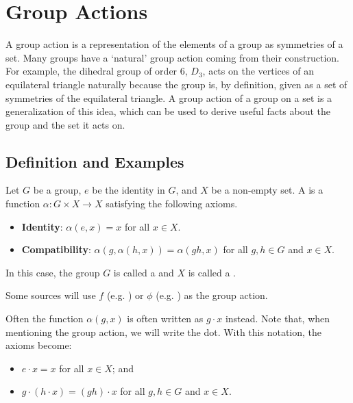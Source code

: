 \chapter{Group Actions}
A group action is a representation of the elements of a group as symmetries of a set. Many groups have a `natural' group action coming from their construction. For example, the dihedral group of order 6, $D_3$, acts on the vertices of an equilateral triangle naturally because the group is, by definition, given as a set of symmetries of the equilateral triangle. A group action of a group on a set is a generalization of this idea, which can be used to derive useful facts about the group and the set it acts on.

\section{Definition and Examples}
\begin{definition}\label{definition-group-action}
    Let $G$ be a group, $e$ be the identity in $G$, and $X$ be a non-empty set. A  is a function $\alpha: G \times X \to X$ satisfying the following axioms.
    \begin{itemize}
        \item \textbf{Identity}: $\alpha(e, x) = x$ for all $x \in X$.
        \item \textbf{Compatibility}: $\alpha(g, \alpha(h, x)) = \alpha(gh, x)$ for all $g, h \in G$ and $x \in X$.
    \end{itemize}
    In this case, the group $G$ is called a  and $X$ is called a .
\end{definition}
\begin{remark}
    Some sources will use $f$ (e.g. \cite{brilliant_group-actions}) or $\phi$ (e.g. \cite{rowland_group-action}) as the group action.
\end{remark}

Often the function $\alpha(g, x)$ is often written as $g \cdot x$ instead. Note that, when mentioning the group action, we will write the dot. With this notation, the axioms become:
\begin{itemize}
    \item $e \cdot x = x$ for all $x \in X$; and
    \item $g \cdot (h \cdot x) = (gh) \cdot x$ for all $g, h \in G$ and $x \in X$.
\end{itemize}

